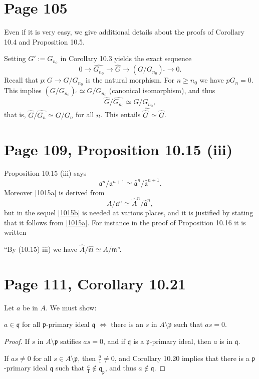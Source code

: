 \documentclass[12pt]{article}
\newcommand{\mf}{\mathfrak}
\begin{document}
\section{Page 105}%

Even if it is very easy, we give additional details about the proofs of Corollary 10.4 and Proposition 10.5. 

Setting $G':=G_{n_0}$ in Corollary 10.3 yields the exact sequence
$$
0\to\widehat{G_{n_0}}\to\widehat G\to(G/G_{n_0})\ \widehat{}\to0.
$$ 
Recall that $p:G\to G/G_{n_0}$ is the natural morphism. For $n\ge n_0$ we have $pG_n=0$. This implies $(G/G_{n_0})\ \widehat{}\simeq G/G_{n_0}$ (canonical isomorphism), and thus 
$$
\widehat G/\widehat{G_{n_0}}\simeq G/G_{n_0},
$$ 
that is, $\widehat G/\widehat{G_n}\simeq G/G_n$ for all $n$. This entails $\widehat{\widehat G\,}\simeq\widehat G$.

\section{Page 109, Proposition 10.15 (iii)}%

Proposition 10.15 (iii) says 
\begin{equation}\label{1015a}
\mf a^n/\mf a^{n+1}\simeq\hat{\mf a}^n/\hat{\mf a}^{n+1}.
\end{equation}
Moreover \eqref{1015a} is derived from 
\begin{equation}\label{1015b}
A/\mf a^n\simeq\hat A^n/\hat{\mf a}^n,
\end{equation} 
but in the sequel \eqref{1015b} is needed at various places, and it is justified by stating that it follows from \eqref{1015a}. For instance in the proof of Proposition 10.16 it is written

``By (10.15) iii) we have $\hat A/\hat{\mf m}\simeq A/\mf m$''.

\section{Page 111, Corollary 10.21}%

Let $a$ be in $A$. We must show: 

$a\in\mf q$ for all $\mf p$-primary ideal $\mf q$ $\iff$ there is an $s$ in $A\setminus\mf p$ such that $as=0$. 

\begin{proof} 
If $s$ in $A\setminus\mf p$ satifies $as=0$, and if $\mf q$ is a $\mf p$-primary ideal, then $a$ is in $\mf q$.

If $as\neq0$ for all $s\in A\setminus\mf p$, then $\frac a1\neq0$, and Corollary 10.20 implies that there is a $\mf p$-primary ideal $\mf q$ such that $\frac a1\notin\mf q_{\mf p}$, and thus $a\notin\mf q$. 
\end{proof}
\end{document}
